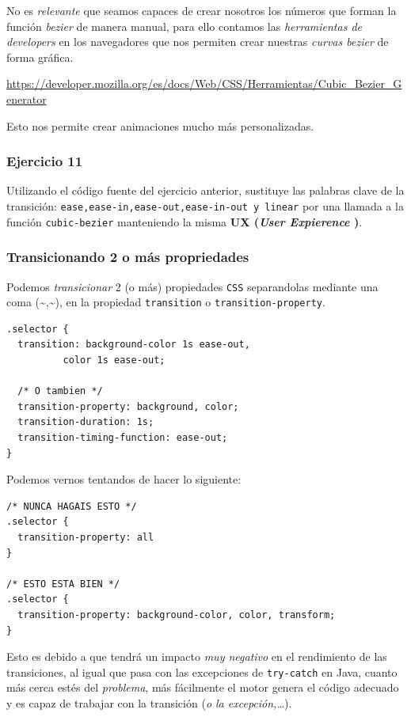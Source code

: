 \documentclass[11pt]{article}
\begin{document}
No es \emph{relevante} que seamos capaces de crear nosotros los números que
forman la función \emph{bezier} de manera manual, para ello contamos las
\emph{herramientas de developers} en los navegadores que nos permiten crear
nuestras \emph{curvas bezier} de forma gráfica.

\url{https://developer.mozilla.org/es/docs/Web/CSS/Herramientas/Cubic_Bezier_Generator}


Esto nos permite crear animaciones mucho más personalizadas.

\subsubsection{Ejercicio 11}
\label{sec-1-2-9}

Utilizando el código fuente del ejercicio anterior, sustituye las palabras
clave de la transición: \verb~ease,ease-in,ease-out,ease-in-out y linear~ por una
llamada a la función \verb~cubic-bezier~ manteniendo la misma \textbf{UX (\emph{User
Expierence} )}.

\subsubsection{Transicionando 2 o más propriedades}
\label{sec-1-2-10}

Podemos \emph{transicionar} 2 (o más) propiedades \verb~CSS~ separandolas mediante una
coma (\textasciitilde{},\textasciitilde{}), en la propiedad \verb~transition~ o \verb~transition-property~.

\begin{verbatim}
.selector {
  transition: background-color 1s ease-out,
	      color 1s ease-out;

  /* O tambien */
  transition-property: background, color;
  transition-duration: 1s;
  transition-timing-function: ease-out;
}
\end{verbatim}

Podemos vernos tentandos de hacer lo siguiente:

\begin{verbatim}
/* NUNCA HAGAIS ESTO */
.selector {
  transition-property: all
}

/* ESTO ESTA BIEN */
.selector {
  transition-property: background-color, color, transform;
}
\end{verbatim}

Esto es debido a que tendrá un impacto \emph{muy negativo} en el rendimiento de
las transiciones, al igual que pasa con las excepciones de \verb~try-catch~ en
Java, cuanto más cerca estés del \emph{problema}, más fácilmente el motor genera
el código adecuado y es capaz de trabajar con la transición (\emph{o la
excepción,\ldots{}}).
\end{document}
